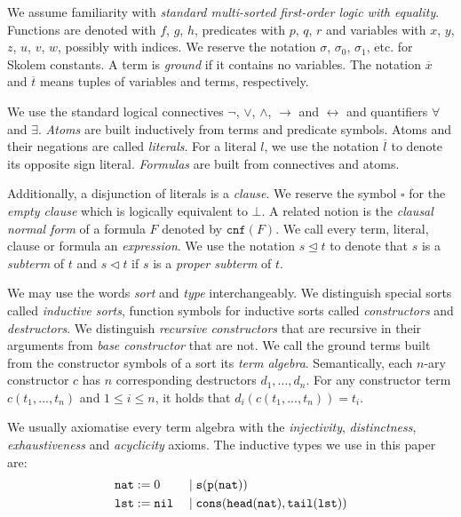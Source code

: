 
We assume familiarity with \textit{standard multi-sorted first-order logic with equality}. Functions are denoted with $f$, $g$, $h$, predicates with $p$, $q$, $r$ and variables with $x$, $y$, $z$, $u$, $v$, $w$, possibly with indices. We reserve the notation $\sigma$, $\sigma_0$, $\sigma_1$, etc. for Skolem constants. A term is \textit{ground} if it contains no variables. The notation $\overline{x}$ and $\overline{t}$ means tuples of variables and terms, respectively.

We use the standard logical connectives $\neg$, $\lor$, $\land$, $\rightarrow$ and $\leftrightarrow$ and quantifiers $\forall$ and $\exists$. \textit{Atoms} are built inductively from terms and predicate symbols. Atoms and their negations are called \textit{literals}. For a literal $l$, we use the notation $\overline{l}$ to denote its opposite sign literal. \textit{Formulas} are built from connectives and atoms.

Additionally, a disjunction of literals is a \textit{clause}. We reserve the symbol $\square$ for the \textit{empty clause} which is logically equivalent to $\bot$. A related notion is the \textit{clausal normal form} of a formula $F$ denoted by $\mathtt{cnf}(F)$. We call every term, literal, clause or formula an \textit{expression}. We use the notation $s\trianglelefteq t$ to denote that $s$ is a \textit{subterm} of $t$ and $s\triangleleft t$ if $s$ is a \textit{proper subterm} of $t$.

We may use the words \textit{sort} and \textit{type} interchangeably. We distinguish special sorts called \textit{inductive sorts}, function symbols for inductive sorts called \textit{constructors} and \textit{destructors}. We distinguish \textit{recursive constructors} that are recursive in their arguments from \textit{base constructor} that are not. We call the ground terms built from the constructor symbols of a sort its \textit{term algebra}. Semantically, each $n$-ary constructor $c$ has $n$ corresponding destructors $d_1,...,d_n$. For any constructor term $c(t_1,...,t_n)$ and $1\le i\le n$, it holds that $d_i(c(t_1,...,t_n))=t_i$.

We usually axiomatise every term algebra with the \textit{injectivity}, \textit{distinctness}, \textit{exhaustiveness} and \textit{acyclicity} axioms. The inductive types we use in this paper are:
$$\begin{aligned}\mathtt{nat}&:=0 &&\mid \mathtt{s}(\mathtt{p}(\mathtt{nat}))\\
\mathtt{lst}&:=\mathtt{nil}&&\mid\mathtt{cons}(\mathtt{head}(\mathtt{nat}),\mathtt{tail}(\mathtt{lst}))\end{aligned}$$


